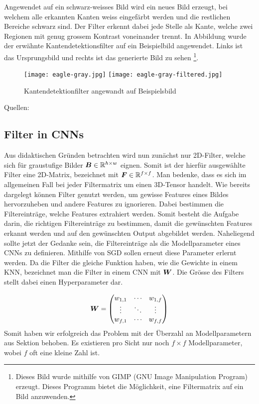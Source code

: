 Angewendet auf ein schwarz-weisses Bild wird ein neues Bild erzeugt, bei welchem alle erkannten
Kanten weiss eingefärbt werden und die restlichen Bereiche schwarz sind.
Der Filter erkennt dabei jede Stelle als Kante, welche zwei Regionen mit
genug grossem Kontrast voneinander trennt.
In Abbildung  wurde der erwähnte Kantendetektionsfilter auf ein
Beispielbild angewendet. Links ist das Ursprungsbild und rechts ist das
generierte Bild zu sehen%
\footnote{
  Dieses Bild wurde mithilfe von GIMP (GNU Image Manipulation Program) erzeugt. Dieses
  Programm bietet die Möglichkeit, eine Filtermatrix auf ein Bild anzuwenden.
}.

\begin{figure}[h!]
  \centering
  \texttt{[image: eagle-gray.jpg]}
  \texttt{[image: eagle-gray-filtered.jpg]}
  \caption{Kantendetektionfilter angewandt auf Beispielsbild \cite{res:eagle_image}}
  \label{fig:edge_filter}
\end{figure}

\para{}
Quellen: \cite{deeplearning.ai:cnn} \cite{wiki:kernel} \cite{net:gimp_conv}


\subsection{Filter in CNNs}
Aus didaktischen Gründen betrachten wird nun zunächst
nur 2D-Filter, welche sich für graustufige Bilder
$\bm{B} \in \mathbb{R}^{h \times w}$ eignen. Somit ist der hierfür ausgewählte
Filter eine 2D-Matrix, bezeichnet mit $\bm{F} \in \mathbb{R}^{f \times
  f}$. Man bedenke, dass es sich im allgemeinen Fall bei jeder Filtermatrix
um einen 3D-Tensor handelt.
\para{}
Wie bereits dargelegt können Filter genutzt werden, um gewisse
Features eines Bildes hervorzuheben und andere Features zu ignorieren. Dabei
bestimmen die Filtereinträge, welche Features extrahiert werden. Somit besteht
die Aufgabe darin, die richtigen Filtereinträge zu bestimmen, damit die
gewünschten Features erkannt werden und auf den gewünschten Output abgebildet
werden. Naheliegend sollte jetzt der Gedanke sein, die Filtereinträge als die
Modellparameter eines CNNs zu definieren.
Mithilfe von SGD sollen erneut diese Parameter
erlernt werden.
\para{}
Da die Filter die gleiche Funktion haben, wie die Gewichte in einem KNN,
bezeichnet man die Filter in einem CNN mit $\bm{W}$. Die Grösse des Filters
stellt dabei einen Hyperparameter dar.

\begin{equation*}
  \bm{W} = \begin{pmatrix}
    w_{1,1} & \cdots & w_{1,f} \\
    \vdots & \ddots & \vdots \\
    w_{f,1} & \cdots & w_{f,f}
  \end{pmatrix}
\end{equation*}
Somit haben wir erfolgreich das Problem mit der Überzahl an Modellparametern aus
Sektion  behoben. Es existieren pro Sicht nur noch $f \times f$
Modellparameter, wobei $f$ oft eine kleine Zahl ist.


